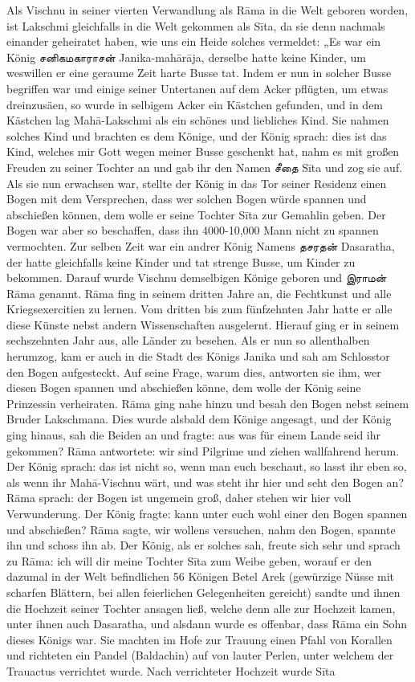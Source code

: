 \documentclass{article}
\newcommand{\TamilText}[1]{\texttamil{#1}}
\newcommand{\tam}[1]{\TamilText{#1}}
\begin{document}
Als Vischnu in seiner vierten Verwandlung als R\={a}ma in die Welt geboren worden, ist Lakschmi gleichfalls in die Welt gekommen als S\={i}ta, da sie denn nachmals einander geheiratet haben, wie uns ein Heide solches vermeldet: „Es war ein König \tam{சனிகமகாராசன்} Janika-mah\={a}r\={a}ja, derselbe hatte keine Kinder, um weswillen er eine geraume Zeit harte Busse tat. Indem er nun in solcher Busse begriffen war und einige seiner Untertanen auf dem Acker pflügten, um etwas dreinzusäen, so wurde in selbigem Acker ein Kästchen gefunden, und in dem Kästchen lag Mah\={a}-Lakschmi als ein schönes und liebliches Kind. Sie nahmen solches Kind und brachten es dem Könige, und der König sprach: dies ist das Kind, welches mir Gott wegen meiner Busse geschenkt hat, nahm es mit großen Freuden zu seiner Tochter an und gab ihr den Namen \tam{சீதை} S\={i}ta und zog sie auf. Als sie nun erwachsen war, stellte der König in das Tor seiner Residenz einen Bogen mit dem Versprechen, dass wer solchen Bogen würde spannen und abschießen können, dem wolle er seine Tochter S\={i}ta zur Gemahlin geben. Der Bogen war aber so beschaffen, dass ihn 4000-10,000 Mann nicht zu spannen vermochten. Zur selben Zeit war ein andrer König Namens \tam{தசரதன்} Dasaratha, der hatte gleichfalls keine Kinder und tat strenge Busse, um Kinder zu bekommen. Darauf wurde Vischnu demselbigen Könige geboren und \tam{இராமன்} R\={a}ma genannt. R\={a}ma fing in seinem dritten Jahre an, die Fechtkunst und alle Kriegsexercitien zu lernen. Vom dritten bis zum fünfzehnten Jahr hatte er alle diese Künste nebst andern Wissenschaften ausgelernt. Hierauf ging er in seinem sechszehnten Jahr aus, alle Länder zu besehen. Als er nun so allenthalben herumzog, kam er auch in die Stadt des Königs Janika und sah am Schlosstor den Bogen aufgesteckt. Auf seine Frage, warum dies, antworten sie ihm, wer diesen Bogen spannen und abschießen könne, dem wolle der König seine Prinzessin verheiraten. R\={a}ma ging nahe hinzu und besah den Bogen nebst seinem Bruder Lakschmana. Dies wurde alsbald dem Könige angesagt, und der König ging hinaus, sah die Beiden an und fragte: aus was für einem Lande seid ihr gekommen? R\={a}ma antwortete: wir sind Pilgrime und ziehen wallfahrend herum. Der König sprach: das ist nicht so, wenn man euch beschaut, so lasst ihr eben so, als wenn ihr Mah\={a}-Vischnu wärt, und was steht ihr hier und seht den Bogen an? R\={a}ma sprach: der Bogen ist ungemein groß, daher stehen wir hier voll Verwunderung. Der König fragte: kann unter euch wohl einer den Bogen spannen und abschießen? R\={a}ma sagte, wir wollens versuchen, nahm den Bogen, spannte ihn und schoss ihn ab. Der König, als er solches sah, freute sich sehr und sprach zu R\={a}ma: ich will dir meine Tochter S\={i}ta zum Weibe geben, worauf er den dazumal in der Welt befindlichen 56 Königen Betel Arek (gewürzige Nüsse mit scharfen Blättern, bei allen feierlichen Gelegenheiten gereicht) sandte und ihnen die Hochzeit seiner Tochter ansagen ließ, welche denn alle zur Hochzeit kamen, unter ihnen auch Dasaratha, und alsdann wurde es offenbar, dass R\={a}ma ein Sohn dieses Königs war. Sie machten im Hofe zur Trauung einen Pfahl von Korallen und richteten ein Pandel (Baldachin) auf von lauter Perlen, unter welchem der Trauactus verrichtet wurde. Nach verrichteter Hochzeit wurde S\={i}ta 
\end{document}
